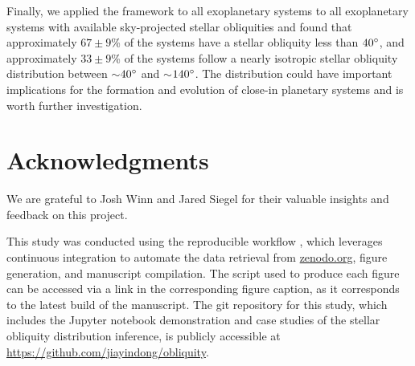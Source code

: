 \documentclass[twocolumn,times]{aastex631}
\begin{document}
Finally, we applied the framework to all exoplanetary systems to all exoplanetary systems with available sky-projected stellar obliquities and found that approximately $67\pm9$\% of the systems have a stellar obliquity less than $40\mbox{$^\circ$}$, and approximately $33\pm9$\% of the systems follow a nearly isotropic stellar obliquity distribution between $\sim$$40\mbox{$^\circ$}$ and $\sim$$140\mbox{$^\circ$}$.
The distribution could have important implications for the formation and evolution of close-in planetary systems and is worth further investigation.

\section*{Acknowledgments}
We are grateful to Josh Winn and Jared Siegel for their valuable insights and feedback on this project.

This study was conducted using the \href{https://github.com/showyourwork/showyourwork}{\showyourwork} reproducible workflow \citep{Luger2021}, which leverages continuous integration to automate the data retrieval from \href{https://zenodo.org/}{zenodo.org}, figure generation, and manuscript compilation.
The script used to produce each figure can be accessed via a link in the corresponding figure caption, as it corresponds to the latest build of the manuscript.
The git repository for this study, which includes the Jupyter notebook demonstration and case studies of the stellar obliquity distribution inference, is publicly accessible at \url{https://github.com/jiayindong/obliquity}.

\vspace*{5mm}



\end{document}
